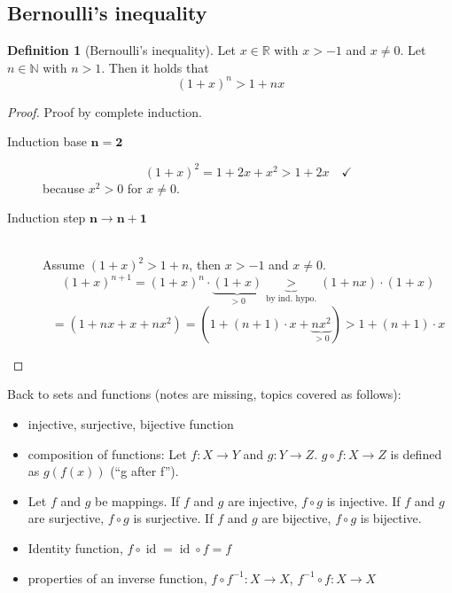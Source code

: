 \documentclass[a4paper,landscape,twocolumn]{article}
\theoremstyle{definition}
\newtheorem{defi}{Definition}
\begin{document}
\subsection{Bernoulli's inequality}
%
\begin{defi}[Bernoulli's inequality]
  Let $x \in \mathbb R$ with $x > -1$ and $x \neq 0$.
  Let $n \in \mathbb N$ with $n > 1$. Then it holds that
  \[ (1 + x)^n > 1 + nx \]
\end{defi}
\begin{proof}
  Proof by complete induction.
  \begin{description}
    \item[Induction base $\mathbf{n = 2}$]
      \[ (1 + x)^2 = 1 + 2x + x^2 > 1 + 2x \quad\checkmark \]
      because $x^2 > 0$ for $x \neq 0$.
    \item[Induction step $\mathbf{n \rightarrow n+1}$] \hfill{} \\
      Assume $(1+x)^2 > 1 + n$, then $x > -1$ and $x \neq 0$.
      \[ (1 + x)^{n+1} = (1 + x)^n \cdot \underbrace{(1 + x)}_{>0} \underbrace{>}_{\text{by ind. hypo.}} (1+nx) \cdot (1 + x) \]
      \[ = (1 + nx + x + nx^2) = (1 + (n+1)\cdot x + \underbrace{nx^2}_{>0}) > 1 + (n + 1) \cdot x \]
  \end{description}
\end{proof}

Back to sets and functions (notes are missing, topics covered as follows):
\begin{itemize}
  \item injective, surjective, bijective function
  \item composition of functions: Let $f: X \rightarrow Y$ and $g: Y \rightarrow Z$. $g \circ f: X \rightarrow Z$ is defined as $g(f(x))$ (\enquote{g after f}).
  \item Let $f$ and $g$ be mappings. If $f$ and $g$ are injective, $f \circ g$ is injective. If $f$ and $g$ are surjective, $f \circ g$ is surjective. If $f$ and $g$ are bijective, $f \circ g$ is bijective.
  \item Identity function, $f \circ \operatorname{id} = \operatorname{id} \circ f = f$
  \item properties of an inverse function, $f \circ f^{-1}: X \rightarrow X$, $f^{-1} \circ f: X \rightarrow X$
\end{itemize}
\end{document}
